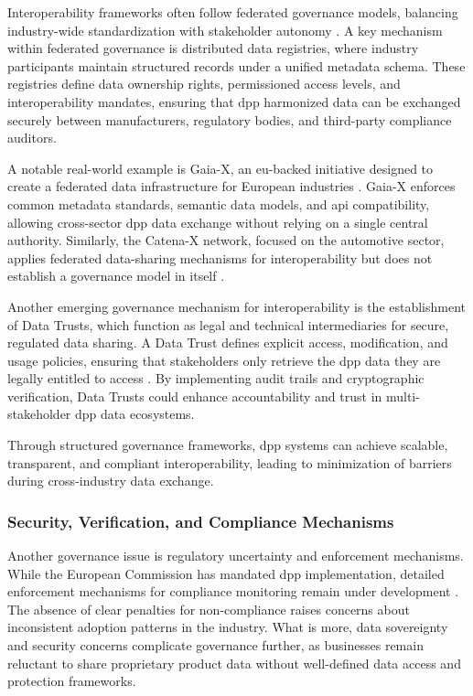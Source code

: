 Interoperability frameworks often follow federated governance models, balancing industry-wide standardization with stakeholder autonomy \autocite{DamjanovicBehrendt.2020}. A key mechanism within federated governance is distributed data registries, where industry participants maintain structured records under a unified metadata schema. These registries define data ownership rights, permissioned access levels, and interoperability mandates, ensuring that \ac{dpp} harmonized data can be exchanged securely between manufacturers, regulatory bodies, and third-party compliance auditors.

A notable real-world example is Gaia-X, an \ac{eu}-backed initiative designed to create a federated data infrastructure for European industries \autocite{Reif.2024}. Gaia-X enforces common metadata standards, semantic data models, and \ac{api} compatibility, allowing cross-sector \ac{dpp} data exchange without relying on a single central authority. Similarly, the Catena-X network, focused on the automotive sector, applies federated data-sharing mechanisms for interoperability but does not establish a governance model in itself \autocite{DamjanovicBehrendt.2020}.

Another emerging governance mechanism for interoperability is the establishment of Data Trusts, which function as legal and technical intermediaries for secure, regulated data sharing. A Data Trust defines explicit access, modification, and usage policies, ensuring that stakeholders only retrieve the \ac{dpp} data they are legally entitled to access \autocite{DigitalAutonomyHub.2020}. By implementing audit trails and cryptographic verification, Data Trusts could enhance accountability and trust in multi-stakeholder \ac{dpp} data ecosystems.

Through structured governance frameworks, \ac{dpp} systems can achieve scalable, transparent, and compliant interoperability, leading to minimization of barriers during cross-industry data exchange.

\subsubsection*{Security, Verification, and Compliance Mechanisms}
Another governance issue is regulatory uncertainty and enforcement mechanisms. While
the European Commission has mandated \ac{dpp} implementation, detailed enforcement mechanisms for compliance monitoring remain under development \autocite{Pietron.2023}. The absence of clear penalties for non-compliance raises concerns about inconsistent adoption patterns in the industry. What is more, data sovereignty and security concerns complicate governance further, as businesses remain reluctant to share proprietary product data without well-defined data access and protection frameworks.

